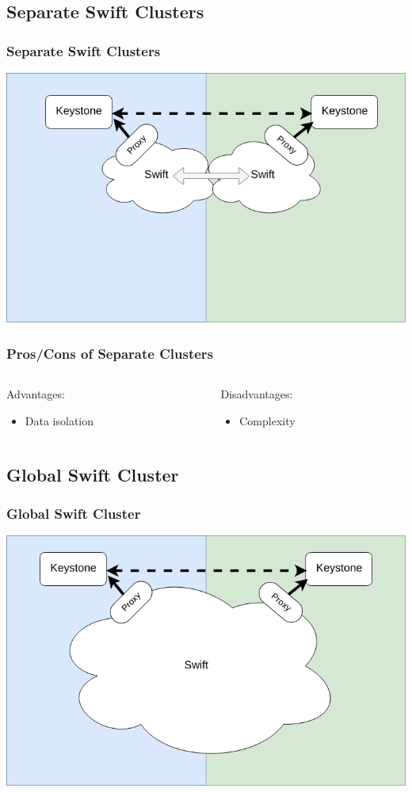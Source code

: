 \documentclass[aspectratio=169,11pt,hyperref={colorlinks=true}]{beamer}
\begin{document}
\subsection{Separate Swift Clusters}
\begin{frame}
\frametitle{Separate Swift Clusters}
\centering
\includegraphics[width=.775\textwidth]{swift-federation-sep-container-sync.png}
\end{frame}

\begin{frame}
\frametitle{Pros/Cons of Separate Clusters}
\begin{columns}[T]
    \begin{column}{.48\textwidth}
        Advantages:
        \begin{itemize}
            \item Data isolation
        \end{itemize}
    \end{column}
    \begin{column}{.48\textwidth}
        Disadvantages:
        \begin{itemize}
            \item Complexity
        \end{itemize}
    \end{column}
\end{columns}
\end{frame}

\subsection{Global Swift Cluster}
\begin{frame}
\frametitle{Global Swift Cluster}
\centering
\includegraphics[width=.775\textwidth]{swift-federation-global.png}
\end{frame}
\end{document}

